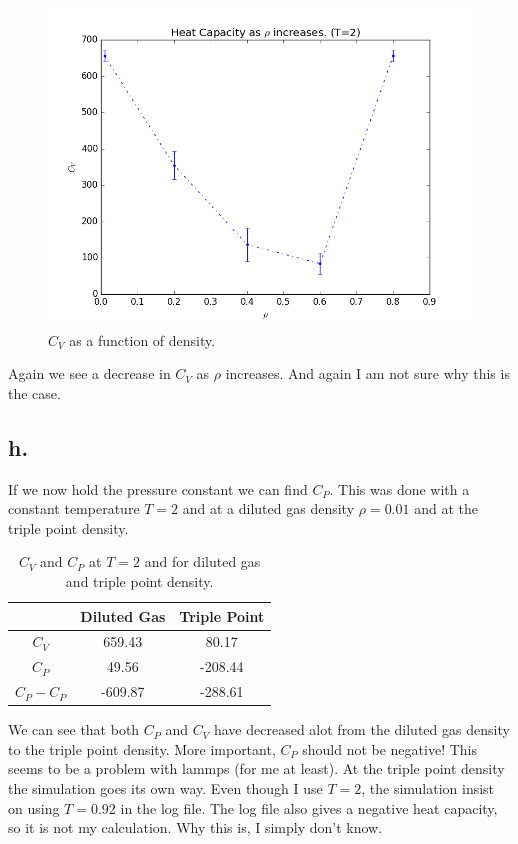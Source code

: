 \documentclass{article}
\begin{document}
\begin{figure}[H]
\centering
\includegraphics[scale=0.5]{project_2/problem_g}
\caption{$C_V$ as a function of density.}
\label{fig:isoTherm}
\end{figure}

Again we see a decrease in $C_V$ as $\rho$ increases. And again I am not sure why this is the case.

\subsection*{h.}
If we now hold the pressure constant we can find $C_P$. This was done with a constant temperature $T=2$ and at a diluted gas density $\rho = 0.01$ and at the triple point density.

\begin{table}[H]
\centering
\begin{tabular}{c|c|c}
& Diluted Gas & Triple Point\\
\hline
$C_V$ & 659.43 & 80.17\\
$C_P$ & 49.56 & -208.44\\
$C_P - C_P$ & -609.87 & -288.61
\end{tabular}
\caption{$C_V$ and $C_P$ at $T=2$ and for diluted gas and triple point density.}
\end{table}

We can see that both $C_P$ and $C_V$ have decreased alot from the diluted gas density to the triple point density. More important, $C_P$ should not be negative! This seems to be a problem with lammps (for me at least). At the triple point density the simulation goes its own way. Even though I use $T=2$, the simulation insist on using $T=0.92$ in the log file. The log file also gives a negative heat capacity, so it is not my calculation. Why this is, I simply don't know.
\end{document}
